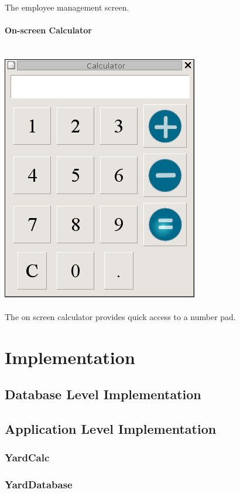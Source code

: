 \documentclass{report}
\begin{document}
\\
The employee management screen.\\
\\
{\bf On-screen Calculator}\\
\\
\\
\includegraphics{ys_calc_screener.png}\\
\\
The on screen calculator provides quick access to a number pad.


\chapter{Implementation}

    \section{Database Level Implementation}

    \section{Application Level Implementation}

    \subsection{YardCalc}

    \subsection{YardDatabase}
\end{document}
